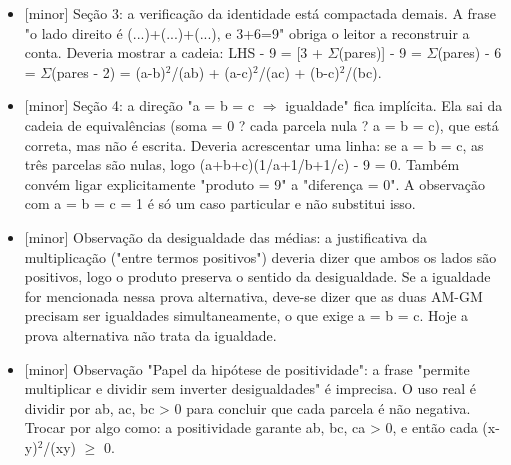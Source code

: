 \documentclass{article}%
\begin{document}
\begin{itemize}%
\item%
{[}minor{]} Seção 3: a verificação da identidade está compactada demais. A frase "o lado direito é (...)+(...)+(...), e 3+6=9" obriga o leitor a reconstruir a conta. Deveria mostrar a cadeia: LHS - 9 = {[}3 + $\Sigma$(pares){]} - 9 = $\Sigma$(pares) - 6 = $\Sigma$(pares - 2) = (a-b)$^2$/(ab) + (a-c)$^2$/(ac) + (b-c)$^2$/(bc).%
\item%
{[}minor{]} Seção 4: a direção "a = b = c $\Rightarrow$ igualdade" fica implícita. Ela sai da cadeia de equivalências (soma = 0 ? cada parcela nula ? a = b = c), que está correta, mas não é escrita. Deveria acrescentar uma linha: se a = b = c, as três parcelas são nulas, logo (a+b+c)(1/a+1/b+1/c) - 9 = 0. Também convém ligar explicitamente "produto = 9" a "diferença = 0". A observação com a = b = c = 1 é só um caso particular e não substitui isso.%
\item%
{[}minor{]} Observação da desigualdade das médias: a justificativa da multiplicação ("entre termos positivos") deveria dizer que ambos os lados são positivos, logo o produto preserva o sentido da desigualdade. Se a igualdade for mencionada nessa prova alternativa, deve{-}se dizer que as duas AM{-}GM precisam ser igualdades simultaneamente, o que exige a = b = c. Hoje a prova alternativa não trata da igualdade.%
\item%
{[}minor{]} Observação "Papel da hipótese de positividade": a frase "permite multiplicar e dividir sem inverter desigualdades" é imprecisa. O uso real é dividir por ab, ac, bc > 0 para concluir que cada parcela é não negativa. Trocar por algo como: a positividade garante ab, bc, ca > 0, e então cada (x-y)$^2$/(xy) $\geq$ 0.%
\end{itemize}%
\end{document}
